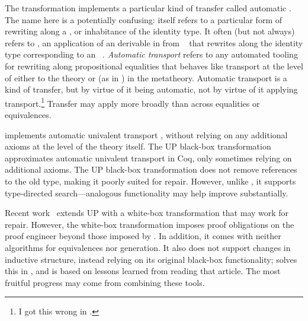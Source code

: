 The \toolnamec transformation implements a particular kind of transfer called automatic .
The name here is a potentially confusing:  itself refers to a particular form of 
rewriting along a , or inhabitance of the identity type.
It often (but not always) refers to  , an application of an  derivable
in  from ~\cite{univalent2013homotopy}
that rewrites along the identity type corresponding to an ~\cite{escardo2018self}.
\textit{Automatic transport} refers to any automated tooling for rewriting along propositional equalities
that behaves like transport at the level of either  to the theory or (as in \toolnamec)  in the metatheory.
Automatic transport is a kind of transfer, but by virtue of it being automatic, not by virtue of it applying transport.\footnote{I got this wrong in .}
Transfer may apply more broadly than across equalities or equivalences.

\toolnamec implements automatic univalent transport , without relying on any additional axioms at the level of the theory itself.
The UP black-box transformation~\cite{tabareau2017equivalences} approximates automatic univalent transport 
in Coq, only sometimes relying on additional axioms.
The UP black-box transformation does not remove references to the old type, making it poorly suited for repair.
However, unlike \toolnamec, it supports type-directed search---analogous functionality
may help improve \toolnamec substantially.

Recent work~\cite{tabareau2019marriage} extends UP with 
a white-box transformation that may work for repair.
However, the white-box transformation imposes proof obligations on the proof engineer beyond those imposed by \toolnamec.
In addition, it comes with neither  algorithms for equivalences nor  generation.
It also does not support changes in inductive structure,
instead relying on its original black-box functionality;
 solves this in \toolnamec, and is based on lessons learned from reading that article.
The most fruitful progress may come from combining these tools. %

